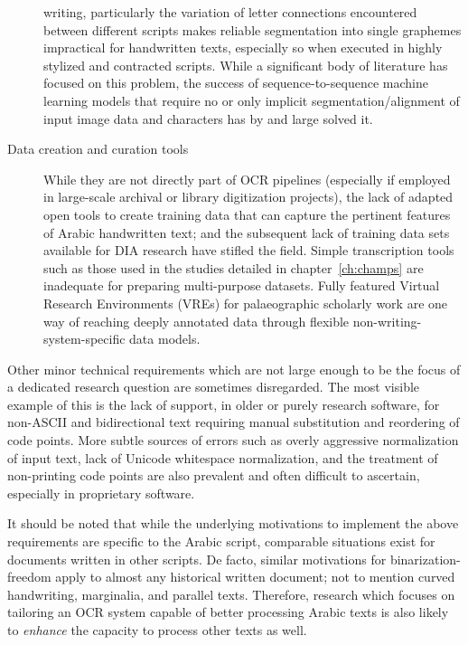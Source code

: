 \begin{description}
		writing, particularly the variation of letter connections
		encountered between different scripts makes reliable
		segmentation into single graphemes impractical for handwritten
		texts, especially so when executed in highly stylized and
		contracted scripts. While a significant body of literature has
		focused on this problem, the success of sequence-to-sequence
		machine learning models that require no or only implicit
		segmentation/alignment of input image data and characters has
		by and large solved it.
	\item[Data creation and curation tools] While they are not directly
		part of OCR pipe\-lines (especially if employed in large-scale
		archival or library digitization projects), the lack of adapted
		open tools to create training data that can capture the
		pertinent features of Arabic handwritten text; and the
		subsequent lack of training data sets available for DIA
		research have stifled the field. Simple transcription tools
		such as those used in the studies detailed in
		chapter~\ref{ch:champs} are inadequate for preparing
		multi-purpose datasets. Fully featured Virtual Research
		Environments (VREs) for palaeographic scholarly work are one
		way of reaching deeply annotated data through flexible
		non-writing-system-specific data models.
\end{description}

Other minor technical requirements which are not large enough to be the focus
of a dedicated research question are sometimes disregarded. The most visible
example of this is the lack of support, in older or purely research software,
for non-ASCII and bidirectional text requiring manual substitution and
reordering of code points. More subtle sources of errors such as overly
aggressive normalization of input text, lack of Unicode whitespace
normalization, and the treatment of non-printing code points are also prevalent
and often difficult to ascertain, especially in proprietary software. 

It should be noted that while the underlying motivations to implement the above
requirements are specific to the Arabic script, comparable situations exist for
documents written in other scripts. De facto, similar motivations for
bin\-ariz\-a\-tion-freedom apply to almost any historical written document; not to
mention curved handwriting, marginalia, and parallel texts. Therefore, research
which focuses on tailoring an OCR system capable of better processing Arabic
texts is also likely to \emph{enhance} the capacity to process other texts as
well.

\printbibliography[heading=subbibliography]
\endrefsection
